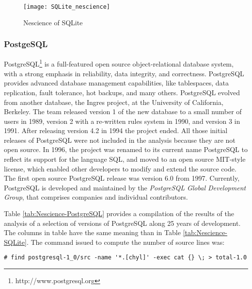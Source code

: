 \begin{figure}[h]
\centering\texttt{[image: SQLite\_nescience]}
\caption{\label{fig:Nescience-of-SQLite}Nescience of SQLite}
\end{figure}

\subsubsection*{PostgeSQL}

PostgreSQL\footnote{http://www.postgresql.org} is a full-featured open source object-relational database system, with a strong emphasis in reliability, data integrity, and correctness. PostgreSQL provides advanced database management capabilities, like tablespaces, data replication, fault tolerance, hot backups, and many others. PostgreSQL evolved from another database, the Ingres project, at the University of California, Berkeley. The team released version 1 of the new database to a small number of users in 1989, version 2 with a re-written rules system in 1990, and version 3 in 1991. After releasing version 4.2 in 1994 the project ended. All those initial releases of PostgreSQL were not included in the analysis because they are not open source. In 1996, the project was renamed to its current name PostgreSQL to reflect its support for the language SQL, and moved to an open source MIT-style license, which enabled other developers to modify and extend the source code. The first open source PostgreSQL release was version 6.0 from 1997. Currently, PostgreSQL is developed and maintained by the \emph{PostgreSQL Global Development Group}, that comprises companies and individual contributors.

Table \ref{tab:Nescience-PostgreSQL} provides a compilation of the results of the analysis of a selection of versions of PostgreSQL along 25 years of development. The columns in table have the same meaning than in Table \ref{tab:Nescience-SQLite}. The command issued to compute the number of source lines was:

\begin{verbatim}
# find postgresql-1_0/src -name '*.[chyl]' -exec cat {} \; > total-1.0
\end{verbatim}


